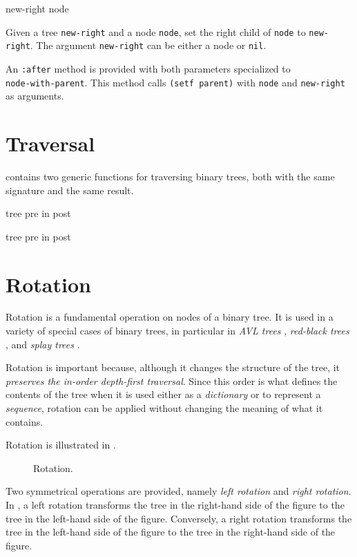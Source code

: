  {new-right node}

Given a tree \texttt{new-right} and a node \texttt{node}, set the
right child of \texttt{node} to \texttt{new-right}.  The argument
\texttt{new-right} can be either a node or \texttt{nil}.

An \texttt{:after} method is provided with both parameters specialized
to\\ \texttt{node-with-parent}.  This method calls \texttt{(setf
  parent)} with \texttt{node} and \texttt{new-right} as arguments.

\section{Traversal}

\sysname{} contains two generic functions for traversing binary trees,
both with the same signature and the same result.

 {tree pre in post}

 {tree pre in post}

\section{Rotation}
\label{sec-rotation}

Rotation is a fundamental operation on nodes of a binary tree.  It is
used in a variety of special cases of binary trees, in particular in
\emph{AVL trees} \cite{Adelson-Velskii_Landis_1962}, \emph{red-black
  trees} \cite{Guibas:1978:DFB:1382432.1382565}, and \emph{splay
  trees} \cite{Sleator:1985:SBS:3828.3835}.

Rotation is important because, although it changes the structure of
the tree, it \emph{preserves the in-order depth-first traversal}.
Since this order is what defines the contents of the tree when it is
used either as a \emph{dictionary} or to represent a \emph{sequence},
rotation can be applied without changing the meaning of what it
contains.

Rotation is illustrated in .

\begin{figure}
\begin{center}
\end{center}
\caption{\label{fig-rotation}
Rotation.}
\end{figure}

Two symmetrical operations are provided, namely \emph{left rotation}
and \emph{right rotation}.  In , a left rotation
transforms the tree in the right-hand side of the figure to the tree
in the left-hand side of the figure.  Conversely, a right rotation
transforms the tree in the left-hand side of the figure to the tree
in the right-hand side of the figure.

